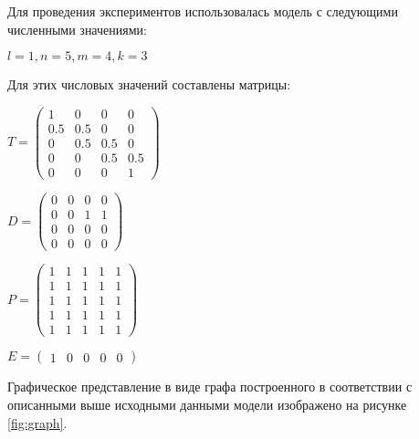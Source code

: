 
Для проведения экспериментов использовалась модель с следующими численными значениями:
\begin{center}
  $l = 1, n = 5, m = 4, k = 3$
\end{center}

Для этих числовых значений составлены матрицы:
\begin{center}
  $
  T = 
  \begin{pmatrix}
      1 &   0 &   0 & 0   \\
    0.5 & 0.5 &   0 & 0   \\
      0 & 0.5 & 0.5 & 0   \\
      0 &   0 & 0.5 & 0.5 \\
      0 &   0 &   0 & 1 
  \end{pmatrix}
  $
\end{center}

\begin{center}
  $
  D = 
  \begin{pmatrix}
    0 & 0 & 0 & 0   \\
    0 & 0 & 1 & 1   \\
    0 & 0 & 0 & 0   \\
    0 & 0 & 0 & 0 
  \end{pmatrix}
  $
\end{center}

\begin{center}
  $
  P = 
  \begin{pmatrix}
    1 & 1 & 1 & 1 & 1   \\
    1 & 1 & 1 & 1 & 1   \\
    1 & 1 & 1 & 1 & 1   \\
    1 & 1 & 1 & 1 & 1   \\
    1 & 1 & 1 & 1 & 1 
  \end{pmatrix}
  $
\end{center}

\begin{center}
  $
  E = \begin{pmatrix}
    1 & 0 & 0 & 0 & 0
  \end{pmatrix}
  $
\end{center}


Графическое представление в виде графа построенного в соответствии с описанными выше исходными данными модели изображено на рисунке \ref{fig:graph}.

